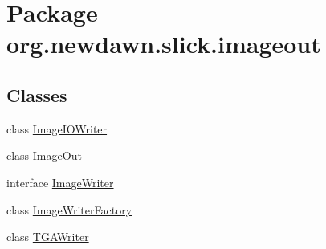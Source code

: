 \hypertarget{namespaceorg_1_1newdawn_1_1slick_1_1imageout}{}\section{Package org.\+newdawn.\+slick.\+imageout}
\label{namespaceorg_1_1newdawn_1_1slick_1_1imageout}
\subsection*{Classes}
\begin{DoxyCompactItemize}
\item 
class \mbox{\hyperlink{classorg_1_1newdawn_1_1slick_1_1imageout_1_1_image_i_o_writer}{Image\+I\+O\+Writer}}
\item 
class \mbox{\hyperlink{classorg_1_1newdawn_1_1slick_1_1imageout_1_1_image_out}{Image\+Out}}
\item 
interface \mbox{\hyperlink{interfaceorg_1_1newdawn_1_1slick_1_1imageout_1_1_image_writer}{Image\+Writer}}
\item 
class \mbox{\hyperlink{classorg_1_1newdawn_1_1slick_1_1imageout_1_1_image_writer_factory}{Image\+Writer\+Factory}}
\item 
class \mbox{\hyperlink{classorg_1_1newdawn_1_1slick_1_1imageout_1_1_t_g_a_writer}{T\+G\+A\+Writer}}
\end{DoxyCompactItemize}
